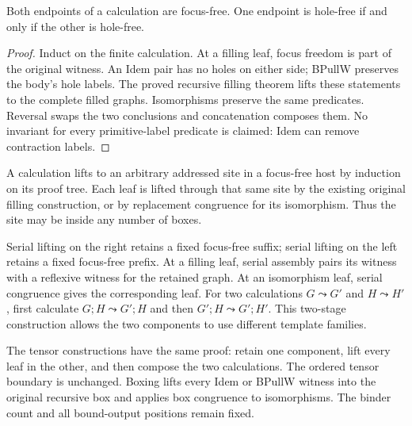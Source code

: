 \begin{lemma}
Both endpoints of a calculation are focus-free. One endpoint is hole-free
if and only if the other is hole-free.
\end{lemma}
\begin{proof}
Induct on the finite calculation. At a filling leaf, focus freedom is part
of the original witness. An Idem pair has no holes on either side; BPullW
preserves the body's hole labels. The proved recursive filling theorem lifts
these statements to the complete filled graphs. Isomorphisms preserve the
same predicates. Reversal swaps the two conclusions and concatenation
composes them. No invariant for every primitive-label predicate is claimed:
Idem can remove contraction labels.
\end{proof}

A calculation lifts to an arbitrary addressed site in a focus-free host by
induction on its proof tree. Each leaf is lifted through that same site by
the existing original filling construction, or by replacement congruence
for its isomorphism. Thus the site may be inside any number of boxes.

Serial lifting on the right retains a fixed focus-free suffix; serial lifting
on the left retains a fixed focus-free prefix. At a filling leaf, serial
assembly pairs its witness with a reflexive witness for the retained graph.
At an isomorphism leaf, serial congruence gives the corresponding leaf.
For two calculations $G\leadsto G'$ and $H\leadsto H'$, first calculate
$G;H\leadsto G';H$ and then $G';H\leadsto G';H'$. This two-stage construction
allows the two components to use different template families.

The tensor constructions have the same proof: retain one component, lift
every leaf in the other, and then compose the two calculations. The
ordered tensor boundary is unchanged. Boxing lifts every Idem or BPullW
witness into the original recursive box and applies box congruence to
isomorphisms. The binder count and all bound-output positions remain fixed.


